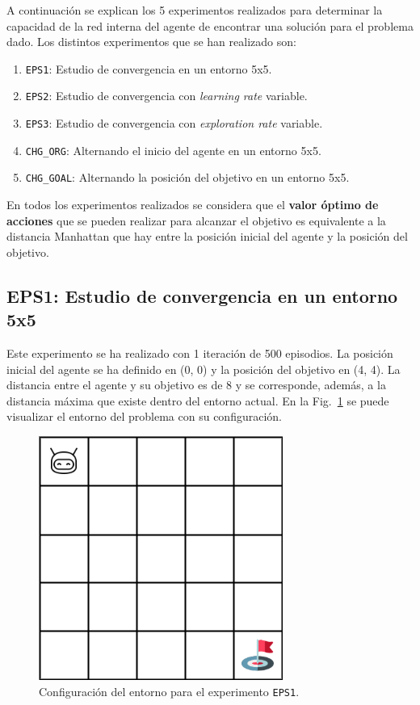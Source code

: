 A continuación se explican los 5 experimentos realizados para determinar la capacidad de la red interna del agente de encontrar una solución para el problema dado. Los distintos experimentos que se han realizado son: 

\begin{enumerate}
    \item \texttt{EPS1}: Estudio de convergencia en un entorno 5x5.
    \item \texttt{EPS2}: Estudio de convergencia con \textit{learning rate} variable.
    \item \texttt{EPS3}: Estudio de convergencia con \textit{exploration rate} variable.
    \item \texttt{CHG\_ORG}: Alternando el inicio del agente en un entorno 5x5.
    \item \texttt{CHG\_GOAL}: Alternando la posición del objetivo en un entorno 5x5.
\end{enumerate}

En todos los experimentos realizados se considera que el \textbf{valor óptimo de acciones} que se pueden realizar para alcanzar el objetivo es equivalente a la distancia Manhattan que hay entre la posición inicial del agente y la posición del objetivo.  

\subsection{EPS1: Estudio de convergencia en un entorno 5x5} \label{EPS1}

Este experimento se ha realizado con 1 iteración de 500 episodios. La posición inicial del agente se ha definido en (0, 0) y la posición del objetivo en (4, 4). La distancia entre el agente y su objetivo es de 8 y se corresponde, además, a la distancia máxima que existe dentro del entorno actual. En la Fig.~\ref{fig:dim5_EPS1} se puede visualizar el entorno del problema con su configuración. \\

\begin{figure}
    \centering
    \includegraphics[scale=0.4]{cap5_experimentacion/images/dim5.png}
    \caption{Configuración del entorno para el experimento \texttt{EPS1}.}
    \label{fig:dim5_EPS1}
\end{figure}

